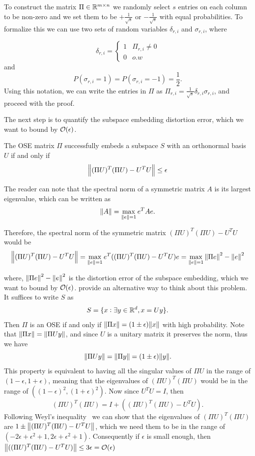 To construct the matrix $\Pi \in \mathbb R^{m \times n}$ we randomly select $s$ entries on each column to be non-zero and we set them to be $+\frac{1}{\sqrt{s}}$ or $-\frac{1}{\sqrt{s}}$ with equal probabilities. To formalize this we can use two sets of random variables $\delta_{r,i}$ and $\sigma_{r, i}$, where 

$$
 \delta_{r, i} = 
\begin{cases} 
    1 & \Pi_{r, i} \neq 0 \\
    0 & o.w
\end{cases}
$$
and 
$$
P(\sigma_{r, i} = 1) = P(\sigma_{r, i} = -1) = \frac{1}{2}.
$$
Using this notation, we can write the entries in $\Pi$ as $\Pi_{r, i} = \frac{1}{\sqrt{s}} \delta_{r, i} \sigma_{r, i}$, and proceed with the proof. 

The next step is to quantify the subspace embedding distortion error, which we want to bound by $\mathcal{O}({\epsilon})$. 


\begin{fact}
    The OSE matrix $\Pi$ successfully embeds a subspace $S$ with an orthonormal basis $U$ if and only if 
    \begin{equation}
        \norm{(\Pi U)^T (\Pi U) - U^TU} \leq \epsilon
    \end{equation}
\end{fact}
\begin{proofsketch}


The reader can note that the spectral norm of a symmetric matrix $A$ is its largest eigenvalue, which can be written as $$ \norm{A} = \max_{\norm{e} = 1} {e^T A e}.$$

Therefore, the spectral norm of the symmetric matrix $(\Pi U)^T (\Pi U) - U^TU$ would be 
$$\norm{(\Pi U)^T (\Pi U) - U^TU} = \max_{\norm{e} = 1}{
     e^T ((\Pi U)^T (\Pi U) - U^TU) e }= \max_{\norm{e} = 1}{\norm{\Pi e}^2 - \norm{e}^2}$$

where, $\norm{\Pi e}^2 - \norm{e}^2$ is the distortion error of the subspace embedding, which we want to bound by $\mathcal{O}({\epsilon})$. \cite{nelson2013osnap} provide an alternative way to think about this problem. It suffices to write $S$ as $$S = \{x : \exists y \in \mathbb R^{d}, x = Uy\}.$$
Then $\Pi$ is an OSE if and only if $\norm{\Pi x} = (1 \pm \epsilon)\norm{x}$ with high probability. Note that $\norm{\Pi x} = \norm{\Pi U y}$, and since $U$ is a unitary matrix it preserves the norm, thus we have $$\norm{\Pi U y} = \norm{\Pi y} = (1 \pm \epsilon) \norm{y}.$$ 
This property is equivalent to having all the singular values of $\Pi U$ in the range of $(1 - \epsilon, 1 + \epsilon)$, meaning that the eigenvalues of $(\Pi U) ^ T (\Pi U)$ would be in the range of  $( (1 - \epsilon) ^ 2, (1 + \epsilon) ^ 2)$. Now since $U^T U = I$, then 
    $$(\Pi U) ^T (\Pi U) = I + ((\Pi U) ^T (\Pi U) - U^T U).$$
Following Weyl's inequality~\cite{nelson2013osnap} we can show that the eigenvalues of $(\Pi U) ^ T (\Pi U)$ are $1 \pm  \norm{(\Pi U)^T (\Pi U) - U^TU}$, which we need them to be in the range of $(-2\epsilon + \epsilon^2 + 1, 2\epsilon + \epsilon ^2 + 1)$. Consequently if $\epsilon$ is small enough, then $\norm{((\Pi U) ^T (\Pi U) - U^T U)} \leq 3 \epsilon = \calO{(\epsilon)}$

\end{proofsketch}

